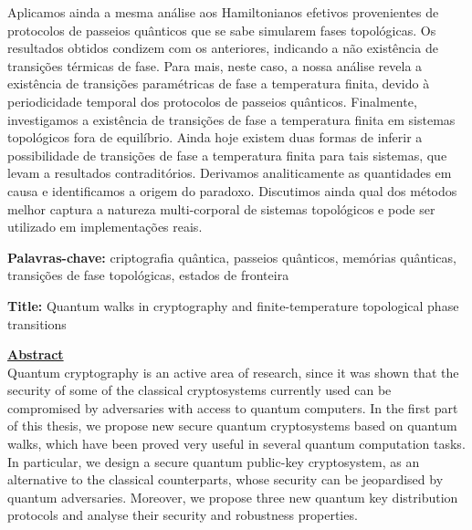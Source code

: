 \documentclass[12pt]{report}
\begin{document}
Aplicamos ainda a mesma an\'{a}lise aos Hamiltonianos efetivos provenientes de protocolos de passeios qu\^{a}nticos que se sabe simularem fases topol\'{o}gicas. Os resultados obtidos condizem com os anteriores, indicando a n\~{a}o exist\^{e}ncia de transi\c{c}\~{o}es t\'{e}rmicas de fase. Para mais, neste caso, a nossa an\'{a}lise revela a exist\^{e}ncia de transi\c{c}\~{o}es param\'{e}tricas de fase a temperatura finita, devido \`{a} periodicidade temporal dos protocolos de passeios qu\^{a}nticos.
Finalmente, investigamos a exist\^{e}ncia de transi\c{c}\~{o}es de fase a temperatura finita em sistemas topol\'{o}gicos fora de equil\'{i}brio. Ainda hoje existem duas formas de inferir a possibilidade de transi\c{c}\~{o}es de fase a temperatura finita para tais sistemas, que levam a resultados contradit\'{o}rios. Derivamos analiticamente as quantidades em causa e identificamos a origem do paradoxo. Discutimos ainda qual dos m\'{e}todos melhor captura a natureza multi-corporal de sistemas topol\'{o}gicos e pode ser utilizado em implementa\c{c}\~{o}es reais.

\vfill
\begin{flushleft}
\textbf{Palavras-chave:} criptografia qu\^{a}ntica, passeios qu\^{a}nticos, mem\'{o}rias qu\^{a}nticas, transi\c{c}\~{o}es de fase topol\'{o}gicas, estados de fronteira
\end{flushleft}
\newpage
\noindent \textbf{Title:} Quantum walks in cryptography and finite-temperature topological phase transitions

\vspace{2\baselineskip}

\underline{\textbf{Abstract}}\\
\noindent Quantum cryptography is an active area of research, since it was shown that the security of some of the classical cryptosystems currently used can be compromised by adversaries with access to quantum computers. In the first part of this thesis, we propose new secure quantum cryptosystems based on quantum walks, which have been proved very useful in several quantum computation tasks. In particular, we design a secure quantum public-key cryptosystem, as an alternative to the classical counterparts, whose security can be jeopardised by quantum adversaries. Moreover, we propose three new quantum key distribution protocols and analyse their security and robustness properties.
\end{document}

